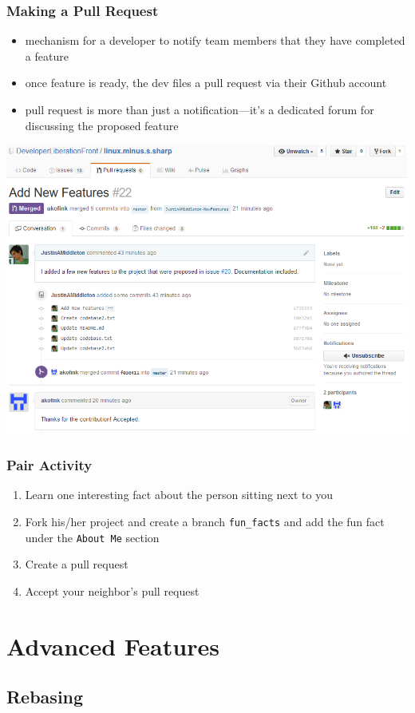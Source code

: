 \documentclass[12pt]{beamer}
\begin{document}
\begin{frame}
\frametitle{Making a Pull Request}
\begin{itemize}
	\item mechanism for a developer to notify team members that they have completed a feature
	\item once feature is ready, the dev files a pull request via their Github account
	\item pull request is more than just a notification—it’s a dedicated forum for discussing the proposed feature
\end{itemize}
\begin{center}
	\includegraphics[width=0.8\linewidth]{pull_request_example}
\end{center}
\end{frame}

\begin{frame}
\frametitle{Pair Activity}
\begin{enumerate}
	\item Learn one interesting fact about the person sitting next to you
	\item Fork his/her project and create a branch \texttt{fun\_facts} and add the fun fact under the \texttt{About Me} section
	\item Create a pull request
	\item Accept your neighbor's pull request
\end{enumerate}
\end{frame}

\section{Advanced Features}
\subsection{Rebasing}
\end{document}
